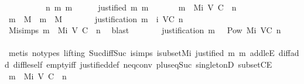 \begin{isabellebody}
\ \ \isamarkupfalse%
\ {\isacharminus}\isanewline
\ \ \ \ \isamarkupfalse%
\ n\ m\ m{\isacharprime}\isanewline
\ \ \ \ \isamarkupfalse%
\ {\isachardoublequoteopen}justified\ m{\isacharprime}\ m{\isachardoublequoteclose}\ \isanewline
\ \ \ \ \isamarkupfalse%
\ {\isachardoublequoteopen}m\ {\isasymin}\ Mi\ {\isacharparenleft}V{\isacharcomma}\ C{\isacharcomma}\ {\isasymepsilon}{\isacharparenright}\ n{\isachardoublequoteclose}\isanewline
\ \ \ \ \isamarkupfalse%
\ {\isachardoublequoteopen}m\ {\isasymin}\ M\ {\isasymand}\ m{\isacharprime}\ {\isasymin}\ M{\isachardoublequoteclose}\isanewline
\ \ \ \ \isamarkupfalse%
\ \isamarkupfalse%
\ {\isachardoublequoteopen}justification\ m\ {\isasymin}\ {\isasymSigma}i\ {\isacharparenleft}V{\isacharcomma}C{\isacharcomma}{\isasymepsilon}{\isacharparenright}\ n{\isachardoublequoteclose}\isanewline
\ \ \ \ \ \ \isamarkupfalse%
\ Mi{\isachardot}simps\ {\isacartoucheopen}m\ {\isasymin}\ Mi\ {\isacharparenleft}V{\isacharcomma}\ C{\isacharcomma}\ {\isasymepsilon}{\isacharparenright}\ n{\isacartoucheclose}\ \isamarkupfalse%
\ blast\isanewline
\ \ \ \ \isamarkupfalse%
\ \isamarkupfalse%
\ {\isachardoublequoteopen}justification\ m\ {\isasymin}\ \ Pow\ {\isacharparenleft}Mi\ {\isacharparenleft}V{\isacharcomma}C{\isacharcomma}{\isasymepsilon}{\isacharparenright}\ {\isacharparenleft}n\ {\isacharminus}\ {}{\isacharparenright}{\isacharparenright}{\isachardoublequoteclose}\isanewline
\ \ \ \ \ \ \isamarkupfalse%
\ {\isacharparenleft}metis\ {\isacharparenleft}no{\isacharunderscore}types{\isacharcomma}\ lifting{\isacharparenright}\ Suc{\isacharunderscore}diff{\isacharunderscore}Suc\ {\isasymSigma}i{\isachardot}simps{\isacharparenleft}{}{\isacharparenright}\ {\isasymSigma}i{\isacharunderscore}subset{\isacharunderscore}Mi\ {\isacartoucheopen}justified\ m{\isacharprime}\ m{\isacartoucheclose}\ add{\isacharunderscore}leE\ diff{\isacharunderscore}add\ diff{\isacharunderscore}le{\isacharunderscore}self\ empty{\isacharunderscore}iff\ justified{\isacharunderscore}def\ neq{}{\isacharunderscore}conv\ plus{\isacharunderscore}{}{\isacharunderscore}eq{\isacharunderscore}Suc\ singletonD\ subsetCE{\isacharparenright}\isanewline
\ \ \ \ \isamarkupfalse%
\ {\isachardoublequoteopen}m{\isacharprime}\ {\isasymin}\ Mi\ {\isacharparenleft}V{\isacharcomma}\ C{\isacharcomma}\ {\isasymepsilon}{\isacharparenright}\ {\isacharparenleft}n\ {\isacharminus}\ {}{\isacharparenright}{\isachardoublequoteclose}\isanewline

\end{isabellebody}
